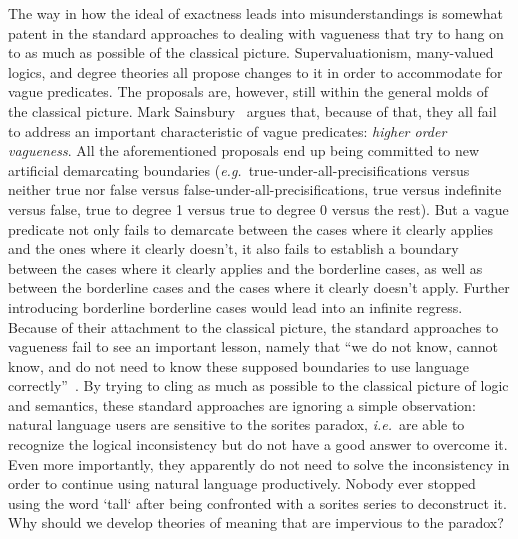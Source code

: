 \documentclass[a4paper]{article}
\begin{document}
The way in how the ideal of exactness leads into misunderstandings is somewhat patent in the standard approaches to dealing with vagueness that try to hang on to as much as possible of the classical picture.
Supervaluationism, many-valued logics, and degree theories all propose changes to it in order to accommodate for vague predicates.
The proposals are, however, still within the general molds of the classical picture.
Mark Sainsbury~\parencite*{sainsbury_concepts_1999} argues that, because of that, they all fail to address an important characteristic of vague predicates: \emph{higher order vagueness}.
All the aforementioned proposals end up being committed to new artificial demarcating boundaries (\emph{e.g.}~true-under-all-precisifications versus neither true nor false versus false-under-all-precisifications, true versus indefinite versus false, true to degree 1 versus true to degree 0 versus the rest).
But a vague predicate not only fails to demarcate between the cases where it clearly applies and the ones where it clearly doesn't, it also fails to establish a boundary between the cases where it clearly applies and the borderline cases, as well as between the borderline cases and the cases where it clearly doesn't apply.
Further introducing borderline borderline cases would lead into an infinite regress.
Because of their attachment to the classical picture, the standard approaches to vagueness fail to see an important lesson, namely that ``we do not know, cannot know, and do not need to know these supposed boundaries to use language correctly''~\parencite*[256]{sainsbury_concepts_1999}.
By trying to cling as much as possible to the classical picture of logic and semantics, these standard approaches are ignoring a simple observation: natural language users are sensitive to the sorites paradox, \emph{i.e.}~are able to recognize the logical inconsistency but do not have a good answer to overcome it.
Even more importantly, they apparently do not need to solve the inconsistency in order to continue using natural language productively.
Nobody ever stopped using the word `tall` after being confronted with a sorites series to deconstruct it.
Why should we develop theories of meaning that are impervious to the paradox?
\end{document}
